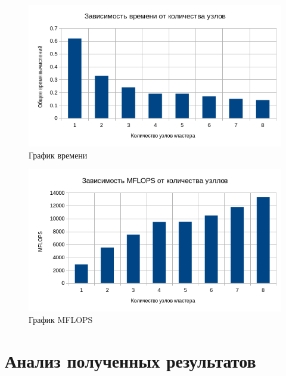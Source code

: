 \begin{figure}[H]
	\centering
	\includegraphics[width=\linewidth]{4-01}
	\caption{График времени}
	\label{plot/01}
\end{figure}


\begin{figure}[H]
	\centering
	\includegraphics[width=\linewidth]{4-02}
	\caption{График MFLOPS}
	\label{plot/02}
\end{figure}


\section{Анализ полученных результатов}

